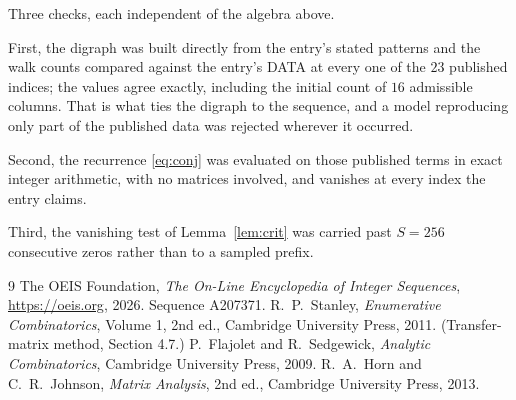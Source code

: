 \documentclass[11pt,a4paper]{article}
\theoremstyle{plain}
\theoremstyle{definition}
\begin{document}
Three checks, each independent of the algebra above.

First, the digraph was built directly from the entry's stated patterns and the walk counts
compared against the entry's DATA at every one of the $23$ published indices; the
values agree exactly, including the initial count of $16$ admissible columns. That is
what ties the digraph to the sequence, and a model reproducing only part of the published
data was rejected wherever it occurred.

Second, the recurrence \eqref{eq:conj} was evaluated on those published terms in exact
integer arithmetic, with no matrices involved, and vanishes at every index the entry claims.

Third, the vanishing test of Lemma~\ref{lem:crit} was carried past $S=256$ consecutive
zeros rather than to a sampled prefix.

\begin{thebibliography}{9}
 The OEIS Foundation, \emph{The On-Line Encyclopedia of Integer
Sequences}, \url{https://oeis.org}, 2026. Sequence A207371.
 R.~P.~Stanley, \emph{Enumerative Combinatorics}, Volume 1, 2nd ed.,
Cambridge University Press, 2011. (Transfer-matrix method, Section 4.7.)
 P.~Flajolet and R.~Sedgewick, \emph{Analytic Combinatorics}, Cambridge
University Press, 2009.
 R.~A.~Horn and C.~R.~Johnson, \emph{Matrix Analysis}, 2nd ed., Cambridge
University Press, 2013.
\end{thebibliography}
\end{document}
